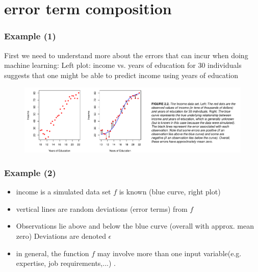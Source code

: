 \documentclass{beamer}
\begin{document}
\section{error term composition}
\begin{frame}
\frametitle{Example (1) }
First we need to understand more about the errors that can incur when doing machine learning:
\newline
Left plot: income vs. years of education for 30 individuals
suggests that one might be able to predict income using years of education

\begin{figure}
\includegraphics[width = 1\linewidth]{figures/03/figure_2_2.png}
\end{figure}
\end{frame}

\begin{frame}
\frametitle{Example (2)}
\begin{itemize}
\item income is a simulated data set $f$ is known (blue curve, right plot)
\item vertical lines are random deviations (error terms) from $f$
\item Observations lie above and below the blue curve (overall with approx. mean zero) Deviations are denoted $\epsilon$
\item in general, the function $f$ may involve more than one input variable(e.g. expertise, job requirements,...) .
\end{itemize} 
\end{frame}
\end{document}
